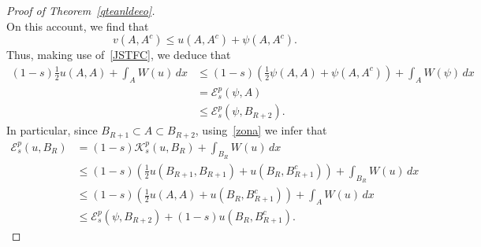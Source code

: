 \documentclass[12pt]{article}
\numberwithin{equation}{section}
\renewcommand{\leq}{\leqslant}
\begin{document}
\begin{proof}[Proof of Theorem~\ref{qteanldeeo}]
\begin{equation*}
\end{equation*}
On this account, we find that 
\begin{equation*}
v(A,A^c)\leq u(A,A^c)+\psi(A,A^c). 
\end{equation*}
Thus, making use of~\eqref{JSTFC}, we deduce that 
\begin{equation}\label{zona}
\begin{split}
(1-s)\frac{1}{2}u(A,A)+\int_{A}W(u)\,dx &\leq (1-s)\left(\frac{1}{2}\psi(A,A)+\psi(A,A^c)\right)+\int_{A}W(\psi)\,dx\\
&=\mathcal{E}_s^p(\psi,A)\\
&\leq \mathcal{E}_s^p(\psi,B_{R+2}). 
\end{split}
\end{equation}
In particular, since $B_{R+1}\subset A\subset B_{R+2}$, using~\eqref{zona} we infer that 
\begin{equation}\label{coag-098lut}
\begin{split}
\mathcal{E}_s^p(u,B_R)&=(1-s)\mathcal{K}_s^p(u,B_R)+\int_{B_R} W(u)\,dx\\
&\leq (1-s)\left(\frac{1}{2}u(B_{R+1},B_{R+1}) +u(B_{R},B_{R+1}^c)\right) +\int_{B_R} W(u)\,dx\\
&\leq (1-s)\left(\frac{1}{2}u(A,A) +u(B_{R},B_{R+1}^c)\right) +\int_{A} W(u)\,dx\\
&\leq  \mathcal{E}_s^p(\psi,B_{R+2})+(1-s)u(B_{R},B_{R+1}^c).
\end{split}
\end{equation}
 

\end{proof}
\end{document}

